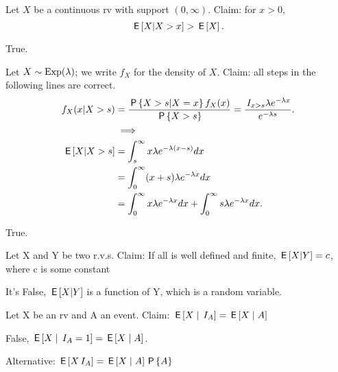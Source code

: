 \documentclass[tf-tutorial-all.tex]{subfiles}
\begin{document}
\begin{truefalse}
Let $X$ be a continuous rv with support $(0, \infty)$. Claim: for $x>0$,
\begin{equation}
\label{eq:6}
\,\mathsf{E}\left[X|X>x\right]>\,\mathsf{E}\left[X\right].
\end{equation}
\begin{solution}
True.
\end{solution}
\end{truefalse}

\begin{truefalse}
Let $X \sim \mathrm{Exp}(\lambda)$; we write $f_{X}$ for the density of $X$.
Claim:  all steps in the following lines are correct.
\begin{align*}
 f_{X}(x|X>s) &= \frac{\,\mathsf{P}\left\{X>s|X=x\right\}f_{X}(x)}{\,\mathsf{P}\left\{X>s\right\}} = \frac{ \,I_{x > s} \lambda e^{-\lambda x}}{e^{-\lambda s}}. \\
&  \implies \\
    \,\mathsf{E}\left[X|X>s\right] &= \int^{\infty}_{s} x \lambda e^{-\lambda(x-s)} dx\\
    &= \int^{\infty}_{0}(x + s) \lambda e^{-\lambda x} dx \\
    &= \int^{\infty}_{0}x  \lambda e^{-\lambda x} dx + \int^{\infty}_{0} s \lambda e^{-\lambda x} dx.
\end{align*}
\begin{solution}
True.
\end{solution}
\end{truefalse}

\begin{truefalse}
Let X and Y be two r.v.s. Claim:
If all is well defined and finite, $\,\mathsf{E}\left[X|Y\right] = c$, where c is some constant
\begin{solution}
It's False, $\,\mathsf{E}\left[X|Y\right]$ is a function of Y, which is a random variable.
\end{solution}
\end{truefalse}

\begin{truefalse}
Let X be an rv and A an event. Claim: $\,\mathsf{E}\left[X\mid\,I_{A}\right] = \,\mathsf{E}\left[X\mid A\right]$
\begin{solution}
  False, $\,\mathsf{E}\left[X\mid\,I_{A} = 1\right] = \,\mathsf{E}\left[X\mid A\right]$.
  
  Alternative: $\,\mathsf{E}\left[X\,I_{A}\right] = \,\mathsf{E}\left[X\mid A\right] \,\mathsf{P}\left\{A\right\}$
\end{solution}
\end{truefalse}
\end{document}
